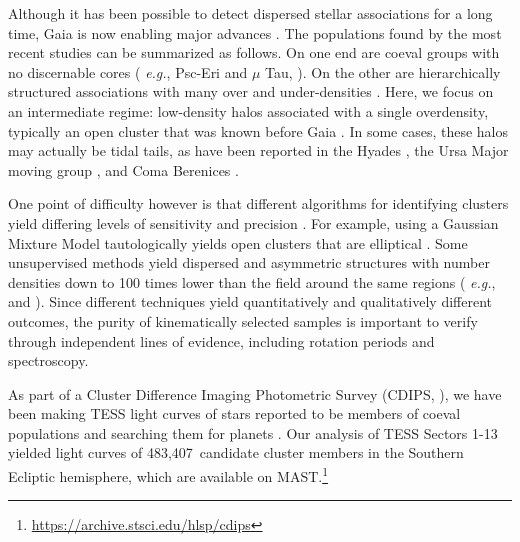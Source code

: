 \documentclass[12pt,twocolumn,tighten]{aastex63}
\newcommand{\numsouthernuniqlcs}{483{,}407} %
\begin{document}
Although it has been possible to detect dispersed stellar associations
for a long time, Gaia is now enabling major advances \citep[{\it
e.g.},][]{de_zeeuw_hipparcos_1999,bergond_gravitational_2001,zuckerman_young_2004,oh_comoving_2017,cantatgaudin_gaia_2018,gagne_banyan_XII_2018,gagne_banyan_XIII_2018,kounkel_apogee2_2018,zari_3d_2018,kounkel_untangling_2019,furnkranz_comabernbhr_2019}.
The populations found by the most recent studies can be summarized as
follows.  On one end are coeval groups with no discernable cores ({\it
e.g.}, Psc-Eri and $\mu$ Tau,
\citealt{meingast_psceri_2019,curtis_tess_2019,gagne_mutau_2020}).  On
the other are hierarchically structured associations with many over
and under-densities  \citep[{\it e.g.} the Sco-Cen and Vela
associations,][]{pecaut_star_2016,cantatgaudin_velaOB2_2019}.  Here,
we focus on an intermediate regime: low-density halos associated with
a single overdensity, typically an open cluster that was known before
Gaia
\citep[see][]{kounkel_untangling_2019,kounkel_untanglingII_2020,meingast_2021}.
In some cases, these halos may actually be tidal tails, as have been
reported in the Hyades \citep{meingast_hyades_2019,roser_hyades_2019},
the Ursa Major moving group \citep{gagne_lowmassUMA_2020}, and Coma
Berenices \citep{tang_comaber_2019,furnkranz_2019}. 

One point of difficulty however is that different algorithms for
identifying clusters yield differing levels of sensitivity and
precision \citep{hunt_clustering_2020}.  For example, using a Gaussian
Mixture Model tautologically yields open clusters that are elliptical
\citep[{\it e.g.},][]{wallace_m4_2018}.  Some unsupervised methods
yield dispersed and asymmetric structures with number densities down
to 100 times lower than the field around the same regions ({\it
e.g.}, \citealt{kounkel_untangling_2019} and \citealt{meingast_2021}).
Since different techniques yield quantitatively and
qualitatively different outcomes, the purity of kinematically selected
samples is important to verify through independent lines of evidence,
including rotation periods and spectroscopy.

As part of a Cluster Difference Imaging Photometric Survey (CDIPS,
\citealt{bouma_cdipsI_2019}), we have been making TESS light
curves of stars reported to be members of coeval populations and
searching them for planets \citep{bouma_cluster_2020}.  Our analysis
of TESS Sectors 1-13 yielded light curves of \numsouthernuniqlcs\
candidate cluster members in the Southern Ecliptic hemisphere, which
are available on
MAST.\footnote{\url{https://archive.stsci.edu/hlsp/cdips}}
\end{document}
